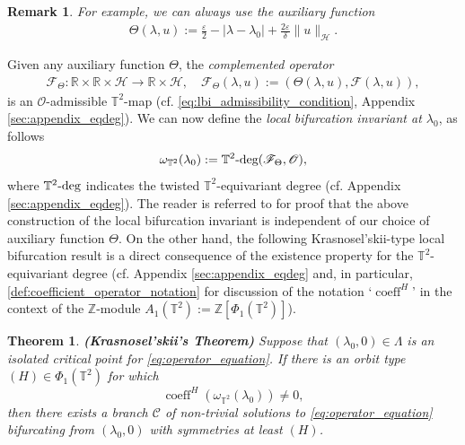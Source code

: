 \documentclass[11pt]{amsart}
\def\br{{\mathbb{R}}}
\def\bz{{\mathbb{Z}}}
\def\bt{{\mathbb{T}}}
\def\br{\mathbb R}
\def\t2deg{\mathbb T^2\text{\rm -deg}}
\newtheorem{theorem}{Theorem}[section]
\newtheorem{remark}{Remark}[section]
\begin{document}
\begin{remark} \rm \label{rm:example_auxilliary_function}
For example, we can always use the auxiliary function
\begin{align} \label{def:auxiliary_function}
    \Theta(\lambda,u) := \frac{\varepsilon}{2} - |\lambda - \lambda_0 | + \frac{2\varepsilon}{\delta} \| u \|_{\mathscr H}.
\end{align}   
\end{remark}
Given any auxiliary function $\Theta$, the {\it complemented operator}
\begin{align} \label{def:complemented_operator_F}
\mathscr F_\Theta : \br \times \br \times \mathscr H \rightarrow \br \times \mathscr H, \quad   \mathscr F_\Theta(\lambda,u):= (\Theta(\lambda,u),\mathscr F(\lambda,u)),
\end{align}
is an $\mathscr O$-admissible $\bt^2$-map (cf. \eqref{eq:lbi_admissibility_condition}, Appendix \ref{sec:appendix_eqdeg}). We can now define the {\it local bifurcation invariant at $\lambda_0$}, as follows
\begin{align} \label{def:local_bif_inv}
\omega_{\bt^2}(\lambda_0) := \t2deg(\mathscr F_\Theta,\mathscr O),
\end{align}
where $\t2deg$ indicates the twisted $\bt^2$-equivariant degree (cf. Appendix \ref{sec:appendix_eqdeg}). The reader is referred to \cite{book-new,AED} for proof that the above construction of the local bifurcation invariant is independent of our choice of auxiliary function $\Theta$. On the other hand, the following Krasnosel'skii-type local bifurcation result is a direct consequence of the existence property for the $\bt^2$-equivariant degree (cf. Appendix \ref{sec:appendix_eqdeg} and, in particular, \eqref{def:coefficient_operator_notation} for discussion  of the notation `$\operatorname{coeff}^H$' in the context of the $\bz$-module $A_1(\bt^2):= \bz[\Phi_1(\bt^2)]$).
\begin{theorem} \rm \label{thm:abstract_local_bif} {\bf (Krasnosel'skii's Theorem)}
Suppose that $(\lambda_0,0) \in \Lambda$ is an isolated critical point for \eqref{eq:operator_equation}. If there is an orbit type $(H) \in \Phi_1(\bt^2)$ for which 
\[
\operatorname{coeff}^H(\omega_{\bt^2}(\lambda_0)) \neq 0,
\]
then there exists a branch $\mathcal C$ of non-trivial solutions to \eqref{eq:operator_equation} bifurcating from $(\lambda_0,0)$ with symmetries at least $(H)$.
\end{theorem}
\end{document}
